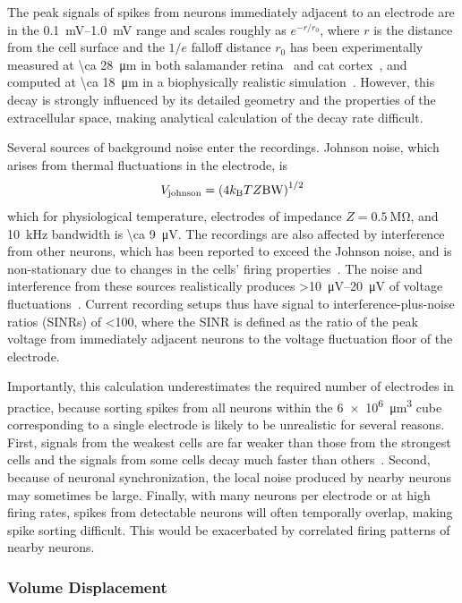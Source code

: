 The peak signals of spikes from neurons immediately adjacent to an electrode are in the \SIrange{0.1}{1.0}{\milli\volt} range and scales roughly as $e^{-r/r_0}$, where $r$ is the distance from the cell surface and the $1/e$ falloff distance $r_0$ has been experimentally measured at \SI{\ca 28}{\micro\meter} in both salamander retina~\cite{segev04} and cat cortex~\cite{gray95}, and computed at \SI{\ca 18}{\micro\meter} in a biophysically realistic simulation~\cite{gold07}.
However, this decay is strongly influenced by its detailed geometry and the properties of the extracellular space, making analytical calculation of the decay rate difficult.

Several sources of background noise enter the recordings.
Johnson noise, which arises from thermal fluctuations in the electrode, is \[V_{\text{\scriptsize johnson}} = \left(4k_{\text{\scriptsize B}} T Z \text{BW}\right)^{1/2}\]
which for physiological temperature, electrodes of impedance $Z = \SI{0.5}{\mega\ohm}$, and \SI{10}{\kilo\hertz} bandwidth is \SI{\ca 9}{\micro\volt}.
The recordings are also affected by interference from other neurons, which has been reported to exceed the Johnson noise, and is non-stationary due to changes in the cells' firing properties~\cite{sahani99}. 
The noise and interference from these sources realistically produces \SIrange{>10}{20}{\micro\volt} of voltage fluctuations~\cite{camunas13}.
Current recording setups thus have signal to interference-plus-noise ratios (SINRs) of \num{<100}, where the SINR is defined as the ratio of the peak voltage from immediately adjacent neurons to the voltage fluctuation floor of the electrode.

Importantly, this calculation underestimates the required number of electrodes in practice, because sorting spikes from all neurons within the \SI{6e6}{\micro\meter\cubed} cube corresponding to a single electrode is likely to be unrealistic for several reasons.
First, signals from the weakest cells are far weaker than those from the strongest cells and the signals from some cells decay much faster than others~\cite{gray95}.
Second, because of neuronal synchronization, the local noise produced by nearby neurons may sometimes be large. 
Finally, with many neurons per electrode or at high firing rates, spikes from detectable neurons will often temporally overlap, making spike sorting difficult.
This would be exacerbated by correlated firing patterns of nearby neurons.

\subsubsection{Volume Displacement}

